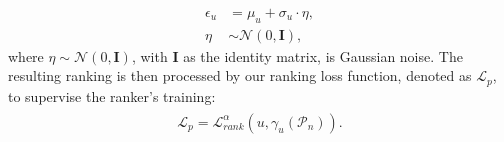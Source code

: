 \begin{align}
\epsilon_{u} &= \mu_u + \sigma_u \cdot \eta,\\
\eta &\sim \mathcal{N}(0, \mathbf{I}),
\end{align}
where $\eta \sim \mathcal{N}(0, \mathbf{I})$, with $\mathbf{I}$ as the identity matrix, is Gaussian noise. The resulting ranking is then processed by our ranking loss function, denoted as $\mathcal{L}_{p}$, to supervise the ranker’s training:
\begin{equation}
\begin{split}
\begin{aligned}
\mathcal{L}_{p} = \mathcal{L}_{rank}^{\alpha}(u,\gamma_{u}(\mathcal{P}_{n})).
\end{aligned}
\end{split}
\end{equation}

